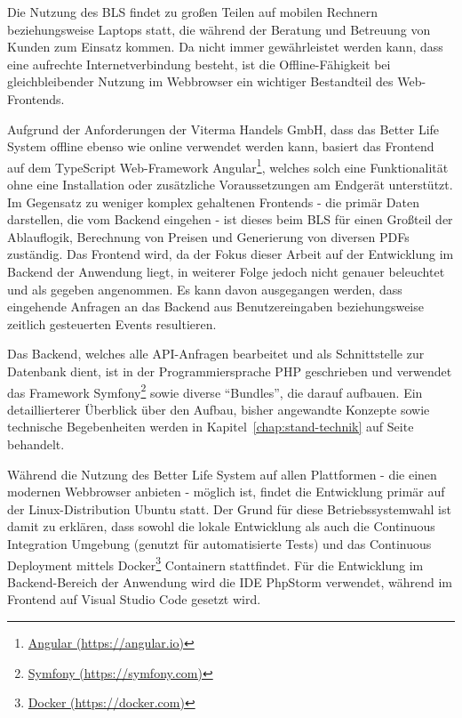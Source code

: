 \documentclass[a4paper,12pt,twoside]{scrreprt}
\begin{document}
Die Nutzung des BLS findet zu großen Teilen auf mobilen Rechnern beziehungsweise Laptops statt, die während der Beratung und Betreuung von Kunden zum Einsatz kommen. Da nicht immer gewährleistet werden kann, dass eine aufrechte Internetverbindung besteht, ist die Offline-Fähigkeit bei gleichbleibender Nutzung im Webbrowser ein wichtiger Bestandteil des Web-Frontends.

Aufgrund der Anforderungen der Viterma Handels GmbH, dass das Better Life System offline ebenso wie online verwendet werden kann, basiert das Frontend auf dem TypeScript Web-Framework Angular\footnote{\href{https://angular.io/}{Angular (https://angular.io)}}, welches solch eine Funktionalität ohne eine Installation oder zusätzliche Voraussetzungen am Endgerät unterstützt. Im Gegensatz zu weniger komplex gehaltenen Frontends - die primär Daten darstellen, die vom Backend eingehen - ist dieses beim BLS für einen Großteil der Ablauflogik, Berechnung von Preisen und Generierung von diversen PDFs zuständig. Das Frontend wird, da der Fokus dieser Arbeit auf der Entwicklung im Backend der Anwendung liegt, in weiterer Folge jedoch nicht genauer beleuchtet und als gegeben angenommen. Es kann davon ausgegangen werden, dass eingehende Anfragen an das Backend aus Benutzereingaben beziehungsweise zeitlich gesteuerten Events resultieren.

\pagebreak

Das Backend, welches alle API-Anfragen bearbeitet und als Schnittstelle zur Datenbank dient, ist in der Programmiersprache PHP geschrieben und verwendet das Framework Symfony\footnote{\href{https://symfony.com/}{Symfony (https://symfony.com)}} sowie diverse \enquote{Bundles}, die darauf aufbauen. Ein detaillierterer Überblick über den Aufbau, bisher angewandte Konzepte sowie technische Begebenheiten werden in Kapitel~\ref{chap:stand-technik} auf Seite \pageref{chap:stand-technik} behandelt.

\medskip

Während die Nutzung des Better Life System auf allen Plattformen - die einen modernen Webbrowser anbieten - möglich ist, findet die Entwicklung primär auf der Linux-Distribution  Ubuntu statt. Der Grund für diese Betriebssystemwahl ist damit zu erklären, dass sowohl die lokale Entwicklung als auch die Continuous Integration Umgebung (genutzt für automatisierte Tests) und das Continuous Deployment mittels Docker\footnote{\href{https://docker.com}{Docker (https://docker.com)}} Containern stattfindet. Für die Entwicklung im Backend-Bereich der Anwendung wird die IDE PhpStorm verwendet, während im Frontend auf Visual Studio Code gesetzt wird.
\end{document}
